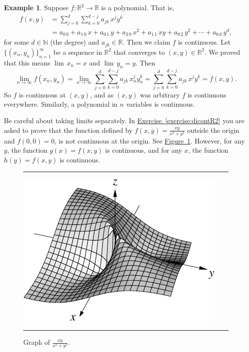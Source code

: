 \documentclass[12pt,openany]{book}
\newcommand{\R}{{\mathbb{R}}}
\newcommand{\N}{{\mathbb{N}}}
\theoremstyle{plain}
\theoremstyle{remark}
\theoremstyle{definition}
\newenvironment{myfig}{%
\begin{figure}[h!t]
\noindent\rule{\textwidth}{0.4pt}\vspace{12pt}\par\centering}%
{\par\noindent\rule{\textwidth}{0.4pt}
\end{figure}}
\theoremstyle{exercise}
\theoremstyle{example}
\newtheorem{example}[thm]{Example}
\newcommand{\figureref}[1]{\hyperref[#1]{Figure~\ref*{#1}}}
\newcommand{\exerciseref}[1]{\hyperref[#1]{Exercise~\ref*{#1}}}
\begin{document}
\begin{example}
Suppose $f \colon \R^2 \to \R$ is a polynomial.  That is,
\begin{equation*}
\begin{split}
f(x,y) & =
\sum_{j=0}^d
\sum_{k=0}^{d-j}
a_{jk}\,x^jy^k \\
& =
a_{0\,0} + a_{1\,0} \, x +
a_{0\,1} \, y+  
a_{2\,0} \, x^2+  
a_{1\,1} \, xy+  
a_{0\,2} \, y^2+ \cdots +
a_{0\,d} \, y^d ,
\end{split}
\end{equation*}
for some $d \in \N$ (the degree) and $a_{jk} \in \R$.  Then we claim 
$f$ is continuous.  Let $\{ (x_n,y_n) \}_{n=1}^\infty$ be a sequence
in $\R^2$ that converges to $(x,y) \in \R^2$.  We proved that this
means $\lim\, x_n = x$ and $\lim\, y_n = y$.  Then
\begin{equation*}
\lim_{n\to\infty}
f(x_n,y_n) =
\lim_{n\to\infty}
\sum_{j=0}^d
\sum_{k=0}^{d-j}
a_{jk} \, x_n^jy_n^k 
=
\sum_{j=0}^d
\sum_{k=0}^{d-j}
a_{jk} \, x^jy^k
=
f(x,y) .
\end{equation*}
So $f$ is continuous at $(x,y)$, and as $(x,y)$ was arbitrary $f$ is
continuous everywhere.  Similarly, a
polynomial in $n$ variables is continuous.
\end{example}

Be careful about taking limits separately.  In \exerciseref{exercise:dicontR2}
you are asked to prove that the function defined by $f(x,y) = \frac{xy}{x^2+y^2}$
outside the origin and $f(0,0) = 0$, is not continuous at the origin.  See
\figureref{fig:xyxsqysq}.
However, for any $y$, the function $g(x) = f(x,y)$ is
continuous,
and for any $x$, the function $h(y) = f(x,y)$ is continuous.
\begin{myfig}
\includegraphics{figures/xyxsqysq}
\caption{Graph of $\frac{xy}{x^2+y^2}$.\label{fig:xyxsqysq}}
\end{myfig}
\end{document}
